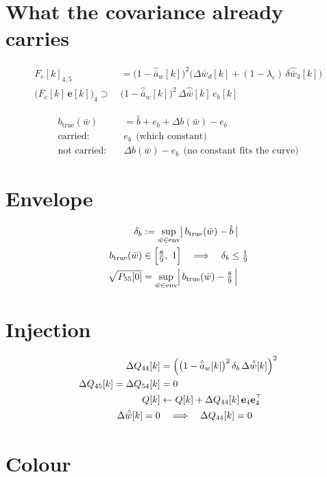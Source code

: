 \documentclass[11pt,a4paper,fontset=none]{ctexart}
\newcommand{\ba}{\bar{a}}
\newcommand{\bw}{\bar{w}}
\newcommand{\dWh}{\Delta\hat{\bw}}
\newcommand{\ah}{\hat{\ba}_w}
\newcommand{\bh}{\hat{b}}
\begin{document}
\section{What the covariance already carries}

\begin{align*}
F_e[k]_{4,5} &= \bigl(1-\ah[k]\bigr)^{2}\bigl(\Delta\bw_d[k] + (1-\lambda_c)\,\delta\hat{\bw}_3[k]\bigr) \\
\bigl(F_e[k]\,\mathbf{e}[k]\bigr)_4 \supset\ & \bigl(1-\ah[k]\bigr)^{2}\,\dWh[k]\,e_b[k]
\end{align*}

\begin{align*}
b_{\mathrm{true}}(\bw) &= \bh + e_b + \Delta b(\bw) - e_b \\
\text{carried:}\quad & e_b \ \ \text{(which constant)} \\
\text{not carried:}\quad & \Delta b(\bw) - e_b \ \ \text{(no constant fits the curve)}
\end{align*}

\section{Envelope}

\begin{align*}
\delta_b &:= \sup_{\bw \in \mathrm{env}} \bigl|\,b_{\mathrm{true}}(\bw) - \bh\,\bigr| \\
b_{\mathrm{true}}(\bw) &\in \Bigl[\tfrac{8}{9},\ 1\Bigr] \quad\Longrightarrow\quad \delta_b \le \tfrac{1}{9} \\
\sqrt{P_{55}[0]} &= \sup_{\bw \in \mathrm{env}} \Bigl|\,b_{\mathrm{true}}(\bw) - \tfrac{8}{9}\,\Bigr|
\end{align*}

\section{Injection}

\begin{align*}
\Delta Q_{44}[k] &= \Bigl(\bigl(1-\ah[k]\bigr)^{2}\,\delta_b\,\dWh[k]\Bigr)^{2} \\
\Delta Q_{45}[k] = \Delta Q_{54}[k] &= 0 \\
Q[k] &\leftarrow Q[k] + \Delta Q_{44}[k]\,\mathbf{e}_4\mathbf{e}_4^{\top} \\
\dWh[k] = 0 &\quad\Longrightarrow\quad \Delta Q_{44}[k] = 0
\end{align*}

\section{Colour}
\end{document}
